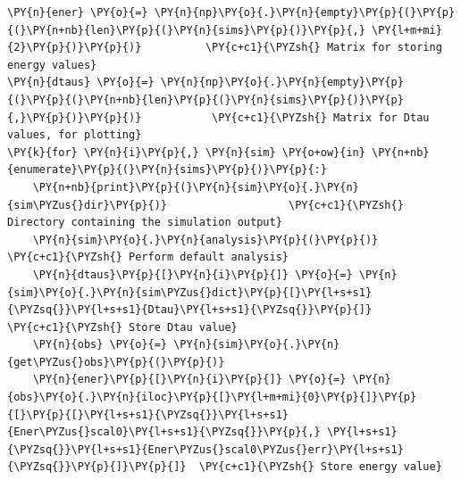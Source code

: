     \begin{tcolorbox}[breakable, size=fbox, boxrule=1pt, pad at break*=1mm,colback=cellbackground, colframe=cellborder]
\begin{Verbatim}[commandchars=\\\{\}]
\PY{n}{ener} \PY{o}{=} \PY{n}{np}\PY{o}{.}\PY{n}{empty}\PY{p}{(}\PY{p}{(}\PY{n+nb}{len}\PY{p}{(}\PY{n}{sims}\PY{p}{)}\PY{p}{,} \PY{l+m+mi}{2}\PY{p}{)}\PY{p}{)}          \PY{c+c1}{\PYZsh{} Matrix for storing energy values}
\PY{n}{dtaus} \PY{o}{=} \PY{n}{np}\PY{o}{.}\PY{n}{empty}\PY{p}{(}\PY{p}{(}\PY{n+nb}{len}\PY{p}{(}\PY{n}{sims}\PY{p}{)}\PY{p}{,}\PY{p}{)}\PY{p}{)}           \PY{c+c1}{\PYZsh{} Matrix for Dtau values, for plotting}
\PY{k}{for} \PY{n}{i}\PY{p}{,} \PY{n}{sim} \PY{o+ow}{in} \PY{n+nb}{enumerate}\PY{p}{(}\PY{n}{sims}\PY{p}{)}\PY{p}{:}
    \PY{n+nb}{print}\PY{p}{(}\PY{n}{sim}\PY{o}{.}\PY{n}{sim\PYZus{}dir}\PY{p}{)}                   \PY{c+c1}{\PYZsh{} Directory containing the simulation output}
    \PY{n}{sim}\PY{o}{.}\PY{n}{analysis}\PY{p}{(}\PY{p}{)}                       \PY{c+c1}{\PYZsh{} Perform default analysis}
    \PY{n}{dtaus}\PY{p}{[}\PY{n}{i}\PY{p}{]} \PY{o}{=} \PY{n}{sim}\PY{o}{.}\PY{n}{sim\PYZus{}dict}\PY{p}{[}\PY{l+s+s1}{\PYZsq{}}\PY{l+s+s1}{Dtau}\PY{l+s+s1}{\PYZsq{}}\PY{p}{]}                          \PY{c+c1}{\PYZsh{} Store Dtau value}
    \PY{n}{obs} \PY{o}{=} \PY{n}{sim}\PY{o}{.}\PY{n}{get\PYZus{}obs}\PY{p}{(}\PY{p}{)}
    \PY{n}{ener}\PY{p}{[}\PY{n}{i}\PY{p}{]} \PY{o}{=} \PY{n}{obs}\PY{o}{.}\PY{n}{iloc}\PY{p}{[}\PY{l+m+mi}{0}\PY{p}{]}\PY{p}{[}\PY{p}{[}\PY{l+s+s1}{\PYZsq{}}\PY{l+s+s1}{Ener\PYZus{}scal0}\PY{l+s+s1}{\PYZsq{}}\PY{p}{,} \PY{l+s+s1}{\PYZsq{}}\PY{l+s+s1}{Ener\PYZus{}scal0\PYZus{}err}\PY{l+s+s1}{\PYZsq{}}\PY{p}{]}\PY{p}{]}  \PY{c+c1}{\PYZsh{} Store energy value}
\end{Verbatim}
\end{tcolorbox}

